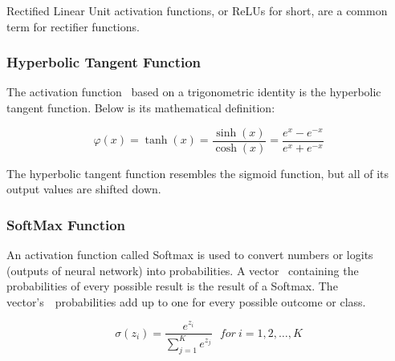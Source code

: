 Rectified Linear Unit activation functions, or ReLUs for short, are a common term for rectifier functions. 


\subsubsection*{Hyperbolic Tangent Function
}
The activation function  based on a trigonometric identity is the hyperbolic tangent function. Below is its mathematical definition:

\begin{equation}
	\varphi(x) = \tanh(x) = \frac{\sinh(x)}{\cosh(x)} = \frac{e^x - e^{-x}}{e^x + e^{-x}}
\end{equation}
\begin{figure}[htp]
	\centering
{}
\end{figure}


The hyperbolic tangent function resembles the sigmoid function, but all of its output values are shifted down.


\subsubsection*{SoftMax Function
}
An activation function called Softmax is used to convert numbers or logits (outputs of neural network) into probabilities. A vector  containing the probabilities of every possible result is the result of a Softmax. The vector's  probabilities add up to one for every possible outcome or class.

\begin{equation}
	\sigma(z_i) = \frac{e^{z_{i}}}{\sum_{j=1}^K e^{z_{j}}} \ \ \ for\ i=1,2,\dots,K
\end{equation}

